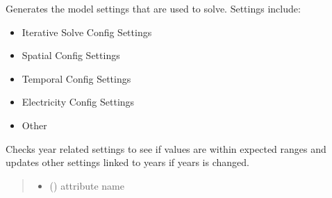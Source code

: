 \documentclass[letterpaper,10pt,english]{sphinxmanual}
\begin{document}
\begin{fulllineitems}
\label{\detokenize{src.common.config_setup:src.common.config_setup.Config_settings}}
\pysigstartsignatures
\pysiglinewithargsret
{}
{\sphinxparamcomma {}\sphinxparamcomma {}}
{}
\pysigstopsignatures
\sphinxAtStartPar
Generates the model settings that are used to solve. Settings include:
\begin{itemize}
\item {} 
\sphinxAtStartPar
Iterative Solve Config Settings

\item {} 
\sphinxAtStartPar
Spatial Config Settings

\item {} 
\sphinxAtStartPar
Temporal Config Settings

\item {} 
\sphinxAtStartPar
Electricity Config Settings

\item {} 
\sphinxAtStartPar
Other

\end{itemize}

\begin{fulllineitems}
\label{\detokenize{src.common.config_setup:src.common.config_setup.Config_settings._additional_year_settings}}
\pysigstartsignatures
\pysiglinewithargsret
{}
{\sphinxparamcomma {}}
{}
\pysigstopsignatures
\sphinxAtStartPar
Checks year related settings to see if values are within expected ranges and updates
other settings linked to years if years is changed.
\begin{quote}\begin{description}
\begin{itemize}
\item {} 
\sphinxAtStartPar
{} () \textendash{} attribute name


\end{itemize}
\end{description}
\end{quote}
\end{fulllineitems}
\end{fulllineitems}
\end{document}
